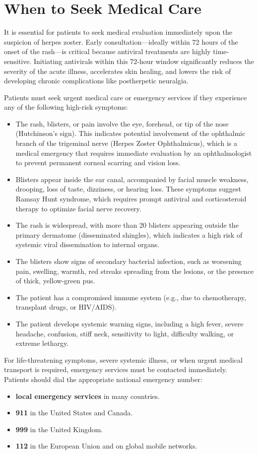 \section*{When to Seek Medical Care}
It is essential for patients to seek medical evaluation immediately upon the suspicion of herpes zoster. Early consultation—ideally within 72 hours of the onset of the rash—is critical because antiviral treatments are highly time-sensitive. Initiating antivirals within this 72-hour window significantly reduces the severity of the acute illness, accelerates skin healing, and lowers the risk of developing chronic complications like postherpetic neuralgia.

Patients must seek urgent medical care or emergency services if they experience any of the following high-risk symptoms:
\begin{itemize}
    \item The rash, blisters, or pain involve the eye, forehead, or tip of the nose (Hutchinson's sign). This indicates potential involvement of the ophthalmic branch of the trigeminal nerve (Herpes Zoster Ophthalmicus), which is a medical emergency that requires immediate evaluation by an ophthalmologist to prevent permanent corneal scarring and vision loss.
    \item Blisters appear inside the ear canal, accompanied by facial muscle weakness, drooping, loss of taste, dizziness, or hearing loss. These symptoms suggest Ramsay Hunt syndrome, which requires prompt antiviral and corticosteroid therapy to optimize facial nerve recovery.
    \item The rash is widespread, with more than 20 blisters appearing outside the primary dermatome (disseminated shingles), which indicates a high risk of systemic viral dissemination to internal organs.
    \item The blisters show signs of secondary bacterial infection, such as worsening pain, swelling, warmth, red streaks spreading from the lesions, or the presence of thick, yellow-green pus.
    \item The patient has a compromised immune system (e.g., due to chemotherapy, transplant drugs, or HIV/AIDS).
    \item The patient develops systemic warning signs, including a high fever, severe headache, confusion, stiff neck, sensitivity to light, difficulty walking, or extreme lethargy.
\end{itemize}
For life-threatening symptoms, severe systemic illness, or when urgent medical transport is required, emergency services must be contacted immediately. Patients should dial the appropriate national emergency number:
\begin{itemize}
    \item \textbf{local emergency services} in many countries.
    \item \textbf{911} in the United States and Canada.
    \item \textbf{999} in the United Kingdom.
    \item \textbf{112} in the European Union and on global mobile networks.
\end{itemize}

